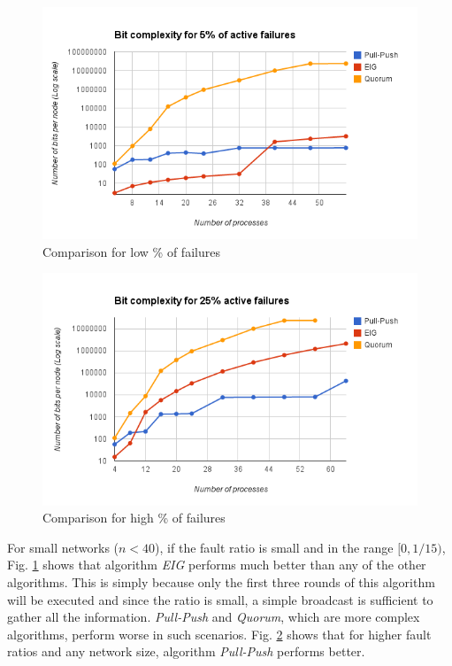 \begin{figure}[ht] \centering  \includegraphics[scale=0.4]{Fault5}
     \caption{Comparison for low \% of failures}
    \label{fig:fault5}  \end{figure}

\begin{figure}[ht] \centering 
    \includegraphics[scale=0.4]{Fault25}  \caption{Comparison for
    high \% of failures} \label{fig:fault25} \end{figure}

For small networks ($n < 40$), if the fault ratio is small and in the range
$[0, 1/15)$, Fig. \ref{fig:fault5} shows that algorithm \textit{EIG} performs
    much better than any of the other algorithms. This is simply because only
    the first three rounds of this algorithm will be executed and since the
    ratio is small, a simple broadcast is sufficient to gather all the
    information. \textit{Pull-Push} and \textit{Quorum}, which are more complex
    algorithms, perform worse in such scenarios. Fig. \ref{fig:fault25} shows
    that for higher fault ratios and any network size, algorithm
    \textit{Pull-Push} performs better.

